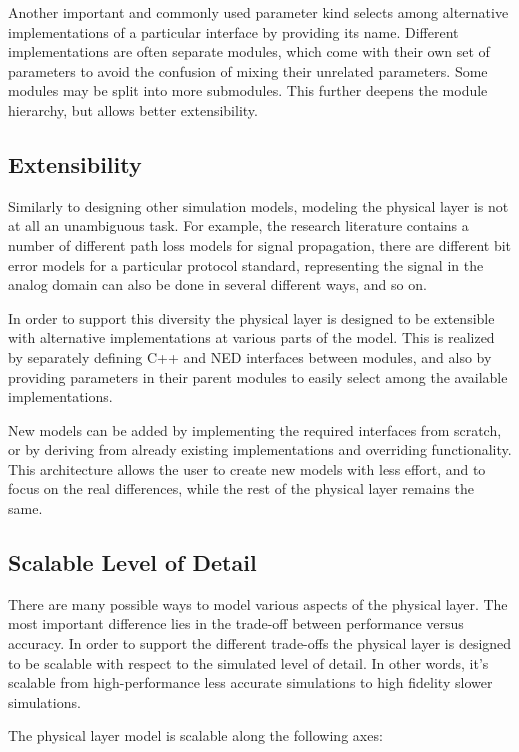 Another important and commonly used parameter kind selects among alternative
implementations of a particular interface by providing its name. Different
implementations are often separate modules, which come with their own set of
parameters to avoid the confusion of mixing their unrelated parameters. Some
modules may be split into more submodules. This further deepens the module
hierarchy, but allows better extensibility.

\subsection{Extensibility}

Similarly to designing other simulation models, modeling the physical layer is
not at all an unambiguous task. For example, the research literature contains a
number of different path loss models for signal propagation, there are different
bit error models for a particular protocol standard, representing the signal in
the analog domain can also be done in several different ways, and so on.

In order to support this diversity the physical layer is designed to be
extensible with alternative implementations at various parts of the model. This
is realized by separately defining C++ and NED interfaces between modules, and
also by providing parameters in their parent modules to easily select among the
available implementations.

New models can be added by implementing the required interfaces from scratch, or
by deriving from already existing implementations and overriding functionality.
This architecture allows the user to create new models with less effort, and to
focus on the real differences, while the rest of the physical layer remains the
same.

\subsection{Scalable Level of Detail}

There are many possible ways to model various aspects of the physical layer.
The most important difference lies in the trade-off between performance versus
accuracy. In order to support the different trade-offs the physical layer is
designed to be scalable with respect to the simulated level of detail. In other
words, it's scalable from high-performance less accurate simulations to high
fidelity slower simulations.

The physical layer model is scalable along the following axes:

